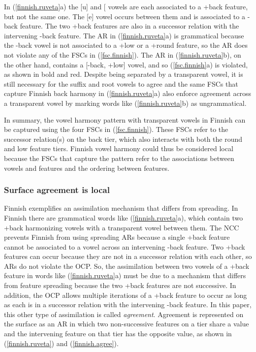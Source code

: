 \documentclass[,doc,floatsintext]{apa6}
\theoremstyle{definition}
\theoremstyle{definition}
\theoremstyle{definition}
\theoremstyle{remark}
\begin{document}
In (\ref{finnish.ruveta}a) the {[}u{]} and {[}\textipa{A}{]} vowels are
each associated to a +back feature, but not the same one. The {[}e{]}
vowel occurs between them and is associated to a -back feature. The two
+back features are also in a successor relation with the intervening
-back feature. The AR in (\ref{finnish.ruveta}a) is grammatical because
the -back vowel is not associated to a +low or a +round feature, so the
AR does not violate any of the FSCs in (\ref{fsc.finnish}). The AR in
(\ref{finnish.ruveta}b), on the other hand, contains a {[}-back, +low{]}
vowel, and so (\ref{fsc.finnish}a) is violated, as shown in bold and
red. Despite being separated by a transparent vowel, it is still
necessary for the suffix and root vowels to agree and the same FSCs that
capture Finnish back harmony in (\ref{finnish.ruveta}a) also enforce
agreement across a transparent vowel by marking words like
(\ref{finnish.ruveta}b) as ungrammatical.

In summary, the vowel harmony pattern with transparent vowels in Finnish
can be captured using the four FSCs in (\ref{fsc.finnish}). These FSCs
refer to the successor relation(s) on the back tier, which also
interacts with both the round and low feature tiers. Finnish vowel
harmony could thus be considered local because the FSCs that capture the
pattern refer to the associations between vowels and features and the
ordering between features.

\subsubsection{Surface agreement is
local}\label{surface-agreement-is-local}

Finnish exemplifies an assimilation mechanism that differs from
spreading. In Finnish there are grammatical words like
(\ref{finnish.ruveta}a), which contain two +back harmonizing vowels with
a transparent vowel between them. The NCC prevents Finnish from using
spreading ARs because a single +back feature cannot be associated to a
vowel across an intervening -back feature. Two +back features can occur
because they are not in a successor relation with each other, so ARs do
not violate the OCP. So, the assimilation between two vowels of a +back
feature in words like (\ref{finnish.ruveta}a) must be due to a mechanism
that differs from feature spreading because the two +back features are
not successive. In addition, the OCP allows multiple iterations of a
+back feature to occur as long as each is in a successor relation with
the intervening -back feature. In this paper, this other type of
assimilation is called \emph{agreement}. Agreement is represented on the
surface as an AR in which two non-successive features on a tier share a
value and the intervening feature on that tier has the opposite value,
as shown in (\ref{finnish.ruveta}) and (\ref{finnish.agree}).
\end{document}
